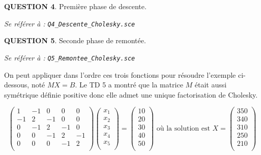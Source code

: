 \documentclass[a4paper,11pt]{article}
\newcommand{\quest}[1]{\small\textbf{#1}\normalsize}
\theoremstyle{nonumberplain}
\theoremstyle{nonumberplain}
\begin{document}
    \bigskip
    \quest{QUESTION 4}. Première phase de descente.
    \begin{ref_scilab}
        \emph{Se référer à :} \texttt{\emph{Q4\_Descente\_Cholesky.sce}}
    \end{ref_scilab}

    \bigskip
    \quest{QUESTION 5}. Seconde phase de remontée.
    \begin{ref_scilab}
        \emph{Se référer à :} \texttt{\emph{Q5\_Remontee\_Cholesky.sce}}
    \end{ref_scilab}

    On peut appliquer dans l'ordre ces trois fonctions pour résoudre l'exemple ci-dessous, noté $MX = B$.
    Le TD 5 a montré que la matrice $M$ était aussi symétrique définie positive
    donc elle admet une unique factorisation de Cholesky.

      \[
      \begin{pmatrix}
          1   &   -1    &   0     &   0     &   0   \\
          -1  &   2     &   -1    &   0     &   0   \\
          0   &   -1    &   2     &   -1    &   0   \\
          0   &   0     &   -1    &   2     &   -1  \\
          0   &   0     &   0     &   -1    &   2   \\
      \end{pmatrix}
      \begin{pmatrix}
          x_1 \\
          x_2 \\
          x_3 \\
          x_4 \\
          x_5 \\
      \end{pmatrix}
      =
      \begin{pmatrix}
          10 \\
          20 \\
          30 \\
          40 \\
          50 \\
      \end{pmatrix}
      \text{ où la solution est }
      X =
      \begin{pmatrix}
          350 \\
          340 \\
          310 \\
          250 \\
          210 \\
      \end{pmatrix}
      \]
\end{document}
